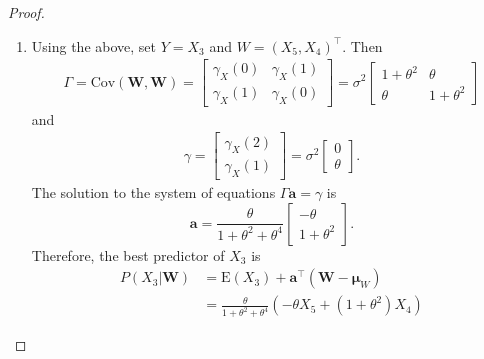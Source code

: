 \documentclass[12pt]{article}
\theoremstyle{definition}
\newcommand{\E}{\text{E}}
\newcommand{\Co}[2]{\text{Cov}({#1}, {#2})}
\newcommand{\vect}[1]{\boldsymbol{#1}}
\begin{document}
\begin{proof}
\begin{enumerate}
    \item Using the above, set $Y = X_3$ and $W = (X_5, X_4)^\intercal$. Then
      \begin{align*}
        \Gamma = \Co{\vect{W}}{\vect{W}} =
        \begin{bmatrix} \gamma_X(0) & \gamma_X(1) \\ \gamma_X(1) & \gamma_X(0) \end{bmatrix} =
        \sigma^2 \begin{bmatrix} 1 + \theta^2 & \theta \\ \theta & 1 + \theta^2 \end{bmatrix}
      \end{align*}
      and
      \begin{align*}
        \gamma = \begin{bmatrix} \gamma_X(2) \\ \gamma_X(1) \end{bmatrix}
        = \sigma^2 \begin{bmatrix} 0 \\ \theta \end{bmatrix}.
      \end{align*}
      The solution to the system of equations $\Gamma \vect{a} = \gamma$ is
      $$\vect{a} = \frac{\theta}{1 + \theta^2 + \theta^4} \begin{bmatrix}-\theta\\ 1 + \theta^2 \end{bmatrix}.$$
      Therefore, the best predictor of $X_3$ is
      \begin{align*}
        P(X_3|\vect{W}) &= \E(X_3) + \vect{a}^\intercal (\vect{W} - \vect{\mu}_W) \\
        &= \frac{\theta}{1 + \theta^2 + \theta^4} (- \theta  X_5 + (1 + \theta^2) X_4)
      \end{align*}


\end{enumerate}
\end{proof}
\end{document}
